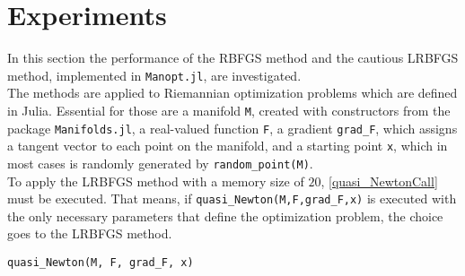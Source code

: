 \section{Experiments}

In this section the performance of the RBFGS method and the cautious LRBFGS method, implemented in \lstinline!Manopt.jl!, are investigated. \\
The methods are applied to Riemannian optimization problems which are defined in Julia. Essential for those are a manifold \lstinline!M!, created with constructors from the package \lstinline!Manifolds.jl!, a real-valued function \lstinline!F!, a gradient \lstinline!grad_F!, which assigns a tangent vector to each point on the manifold, and a starting point \lstinline!x!, which in most cases is randomly generated by \lstinline!random_point(M)!. \\
To apply the LRBFGS method with a memory size of $20$, \cref{quasi_NewtonCall} must be executed. That means, if \lstinline!quasi_Newton(M,F,grad_F,x)! is executed with the only necessary parameters that define the optimization problem, the choice goes to the LRBFGS method. 

\begin{lstlisting}[caption={Call of the \lstinline!quasi_Newton!-function from \lstinline!Manopt.jl! with the necessary input arguments.}, label={quasi_NewtonCall}]
    quasi_Newton(M, F, grad_F, x) 
\end{lstlisting}

